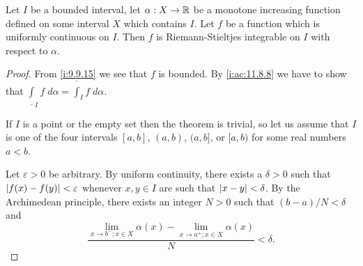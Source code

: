 \begin{ac}\label{i:ac:11.8.15}
  Let \(I\) be a bounded interval, let \(\alpha : X \to \mathbb{R}\) be a monotone increasing function defined on some interval \(X\) which contains \(I\).
  Let \(f\) be a function which is uniformly continuous on \(I\).
  Then \(f\) is Riemann-Stieltjes integrable on \(I\) with respect to \(\alpha\).
\end{ac}

\begin{proof}
  From \cref{i:9.9.15} we see that \(f\) is bounded.
  By \cref{i:ac:11.8.8} we have to show that \(\underline{\int}_I f \; d \alpha = \overline{\int}_I f \; d \alpha\).

  If \(I\) is a point or the empty set then the theorem is trivial, so let us assume that \(I\) is one of the four intervals \([a, b]\), \((a, b)\), \((a, b]\), or \([a, b)\) for some real numbers \(a < b\).

  Let \(\varepsilon > 0\) be arbitrary.
  By uniform continuity, there exists a \(\delta > 0\) such that \(\left\lvert f(x) - f(y)\right\rvert < \varepsilon\) whenever \(x, y \in I\) are such that \(\left\lvert x - y\right\rvert < \delta\).
  By the Archimedean principle, there exists an integer \(N > 0\) such that \((b - a) / N < \delta\) and
  \[
    \dfrac{\lim_{x \to b^- ; x \in X} \alpha(x) - \lim_{x \to a^+ ; x \in X} \alpha(x)}{N} < \delta.
  \]


\end{proof}
